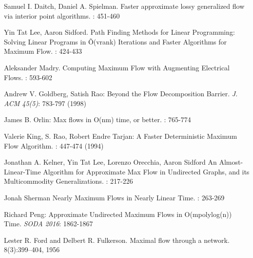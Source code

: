 \documentclass[11pt]{article}
\begin{document}
\begin{thebibliography}{42}

Samuel I. Daitch, Daniel A. Spielman.
\newblock Faster approximate lossy generalized flow via interior point algorithms. 
: 451-460

Yin Tat Lee, Aaron Sidford.
\newblock
Path Finding Methods for Linear Programming: Solving Linear Programs in Õ(vrank) Iterations and Faster Algorithms for Maximum Flow. 
: 424-433

Aleksander Madry. 
\newblock 
Computing Maximum Flow with Augmenting Electrical Flows. 
: 593-602

Andrew V. Goldberg, Satish Rao:
\newblock 
Beyond the Flow Decomposition Barrier. 
\newblock
{\em J. ACM 45(5)}: 783-797 (1998)

James B. Orlin:
\newblock Max flows in O(nm) time, or better. 
: 765-774

Valerie King, S. Rao, Robert Endre Tarjan:
\newblock A Faster Deterministic Maximum Flow Algorithm. 
: 447-474 (1994)

Jonathan A. Kelner, Yin Tat Lee, Lorenzo Orecchia, Aaron Sidford
\newblock 
An Almost-Linear-Time Algorithm for Approximate Max Flow in Undirected Graphs, and its Multicommodity Generalizations. 
: 217-226

Jonah Sherman 
\newblock 
Nearly Maximum Flows in Nearly Linear Time. 
: 263-269

Richard Peng:
\newblock 
Approximate Undirected Maximum Flows in O(mpolylog(n)) Time. 
\newblock
{\em SODA 2016}: 1862-1867

Lester R. Ford and Delbert R. Fulkerson. 
\newblock Maximal flow through a network. 
 8(3):399–404, 1956

\end{thebibliography}
\end{document}
